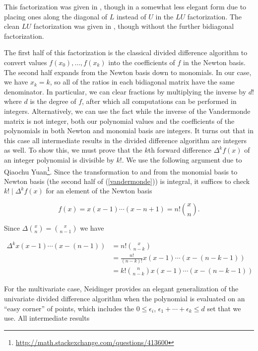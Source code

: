 \documentclass[11pt]{article}
\begin{document}
This factorization was given in \cite{oruc2000explicit}, though in a somewhat less elegant form due to placing ones along the diagonal of $L$ instead of $U$ in the $LU$ factorization.
The clean $LU$ factorization was given in \cite{olver2006multivariate}, though without the further bidiagonal factorization.

The first half of this factorization is the classical divided difference algorithm to convert values $f(x_0), \ldots, f(x_k)$ into the coefficients of $f$ in the Newton
basis.  The second half expands from the Newton basis down to monomials.  In our case, we have $x_k = k$, so all of the ratios in each bidiagonal matrix have the same denominator.
In particular, we can clear fractions by multiplying the inverse by $d!$ where $d$ is the degree of $f$, after which all computations can be performed in integers.  Alternatively,
we can use the fact while the inverse of the Vandermonde matrix is not integer, both our polynomial values and the coefficients of the polynomials in both Newton and monomial basis
are integers.  It turns out that in this case all intermediate results in the divided difference algorithm are integers as well.  To show this, we must prove that the $k$th forward
difference $\Delta^k f(x)$ of an integer polynomial is divisible by $k!$.  We use the following argument due to Qiaochu Yuan\footnote{\url{http://math.stackexchange.com/questions/413600}}.
Since the transformation to and from the monomial basis to Newton basis (the second half of (\ref{vandermonde})) is integral, it suffices to check $k! \mid \Delta^k f(x)$ for an
element of the Newton basis
\begin{linenomath*}
$$f(x) = x(x-1)\cdots(x-n+1) = n!\binom{x}{n}.$$
\end{linenomath*}
Since $\Delta \binom{x}{n} = \binom{x}{n-1}$ we have
\begin{linenomath*}
\begin{align*}
\Delta^k x(x-1)\cdots(x-(n-1))
  &= n! \binom{x}{n-k} \\
  &= \frac{n!}{(n-k)!} x(x-1)\cdots(x-(n-k-1)) \\
  &= k! \binom{n}{n-k} x(x-1)\cdots(x-(n-k-1))
\end{align*}
\end{linenomath*}
For the multivariate case, Neidinger \cite{neidinger2009multivariable} provides an elegant generalization of the univariate divided difference algorithm when the polynomial is
evaluated on an ``easy corner'' of points, which includes the $0 \le \epsilon_i$, $\epsilon_1 + \cdots + \epsilon_k \le d$ set that we use.  All intermediate results
\end{document}
